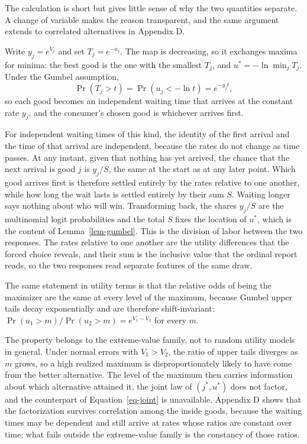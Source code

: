 \documentclass[
  letterpaper,
  DIV=11,
  numbers=noendperiod]{scrartcl}
\theoremstyle{plain}
\theoremstyle{plain}
\theoremstyle{plain}
\theoremstyle{remark}
\begin{document}
The calculation is short but gives little sense of why the two
quantities separate. A change of variable makes the reason transparent,
and the same argument extends to correlated alternatives in Appendix D.

Write \(y_j = e^{V_j}\) and set \(T_j = e^{-u_j}\). The map is
decreasing, so it exchanges maxima for minima: the best good is the one
with the smallest \(T_j\), and \(u^* = -\ln \min_j T_j\). Under the
Gumbel assumption, \[
\Pr \left( T_j > t \right) = \Pr \left( u_j < -\ln t \right) = e^{-y_j t},
\] so each good becomes an independent waiting time that arrives at the
constant rate \(y_j\), and the consumer's chosen good is whichever
arrives first.

For independent waiting times of this kind, the identity of the first
arrival and the time of that arrival are independent, because the rates
do not change as time passes. At any instant, given that nothing has yet
arrived, the chance that the next arrival is good \(j\) is \(y_j / S\),
the same at the start as at any later point. Which good arrives first is
therefore settled entirely by the rates relative to one another, while
how long the wait lasts is settled entirely by their sum \(S\). Waiting
longer says nothing about who will win. Transforming back, the shares
\(y_j / S\) are the multinomial logit probabilities and the total \(S\)
fixes the location of \(u^*\), which is the content of
Lemma~\ref{lem-gumbel}. This is the division of labor between the two
responses. The rates relative to one another are the utility differences
that the forced choice reveals, and their sum is the inclusive value
that the ordinal report reads, so the two responses read separate
features of the same draw.

The same statement in utility terms is that the relative odds of being
the maximizer are the same at every level of the maximum, because Gumbel
upper tails decay exponentially and are therefore shift-invariant:
\(\Pr(u_1 > m) / \Pr(u_2 > m) = e^{V_1 - V_2}\) for every \(m\).

The property belongs to the extreme-value family, not to random utility
models in general. Under normal errors with \(V_1 > V_2\), the ratio of
upper tails diverges as \(m\) grows, so a high realized maximum is
disproportionately likely to have come from the better alternative. The
level of the maximum then carries information about which alternative
attained it, the joint law of \(\left( j^*, u^* \right)\) does not
factor, and the counterpart of Equation~\ref{eq-joint} is unavailable.
Appendix D shows that the factorization survives correlation among the
inside goods, because the waiting times may be dependent and still
arrive at rates whose ratios are constant over time; what fails outside
the extreme-value family is the constancy of those ratios.
\end{document}

